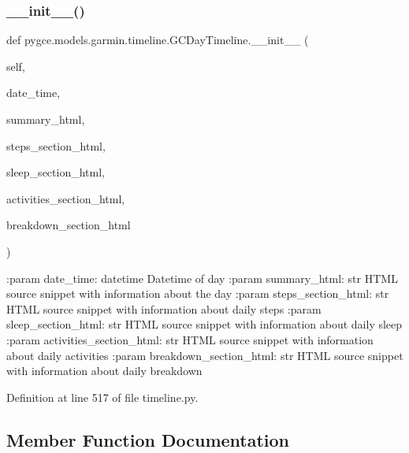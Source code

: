 \subsubsection{\texorpdfstring{\+\_\+\+\_\+init\+\_\+\+\_\+()}{\_\_init\_\_()}}
{\footnotesize\ttfamily def pygce.\+models.\+garmin.\+timeline.\+G\+C\+Day\+Timeline.\+\_\+\+\_\+init\+\_\+\+\_\+ (\begin{DoxyParamCaption}\item[{}]{self,  }\item[{}]{date\+\_\+time,  }\item[{}]{summary\+\_\+html,  }\item[{}]{steps\+\_\+section\+\_\+html,  }\item[{}]{sleep\+\_\+section\+\_\+html,  }\item[{}]{activities\+\_\+section\+\_\+html,  }\item[{}]{breakdown\+\_\+section\+\_\+html }\end{DoxyParamCaption})}

\begin{DoxyVerb}:param date_time: datetime
    Datetime of day
:param summary_html: str
    HTML source snippet with information about the day
:param steps_section_html: str
    HTML source snippet with information about daily steps
:param sleep_section_html: str
    HTML source snippet with information about daily sleep
:param activities_section_html: str
    HTML source snippet with information about daily activities
:param breakdown_section_html: str
    HTML source snippet with information about daily breakdown
\end{DoxyVerb}
 

Definition at line 517 of file timeline.\+py.



\subsection{Member Function Documentation}
\mbox{\label{classpygce_1_1models_1_1garmin_1_1timeline_1_1_g_c_day_timeline_ae2d3f754907b22c3a87715fa8664cb5d}} 
